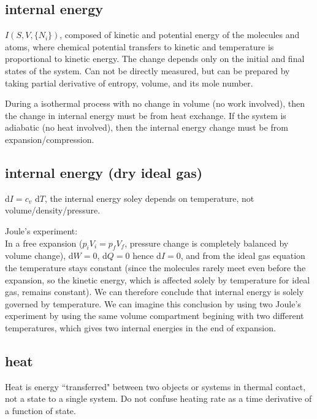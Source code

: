 \subsection{internal energy}
\begin{defn*} $I(S,V,\{N_i\})$, composed of kinetic and potential energy of the molecules and
atoms, where chemical potential transfers to kinetic and temperature is proportional to kinetic
energy. The change depends only on the initial and final states of the system. Can not be directly
measured, but can be prepared by taking partial derivative of entropy, volume, and its mole number. \\
\end{defn*}

During a isothermal process with no change in volume (no work involved), then the
change in internal energy must be from heat exchange. If the system is adiabatic (no heat involved),
then the internal energy change must be from expansion/compression.

\subsection{internal energy (dry ideal gas)}
\begin{defn*} d$I = c_v$ d$T$, the internal energy soley depends on temperature, not
volume/density/pressure. \\
\end{defn*}


{Joule's experiment:} \\
In a free expansion ($p_iV_i = p_fV_f$, pressure change is completely balanced by volume change),
d$W = 0$, d$Q = 0$ hence d$I = 0$, and from the ideal gas equation the temperature stays constant
(since the molecules rarely meet even before the expansion, so the kinetic energy, which is affected
solely by temperature for ideal gas, remains constant). We can therefore conclude that internal
energy is solely governed by temperature. We can imagine this conclusion by using two Joule's
experiment by using the same volume compartment begining with two different temperatures, which
gives two internal energies in the end of expansion. 


\subsection{heat}
\begin{defn*} Heat is energy ``transferred" between two objects or systems in thermal contact, not
a state to a single system. Do not confuse heating rate as a time derivative of a function of state.
\end{defn*}


